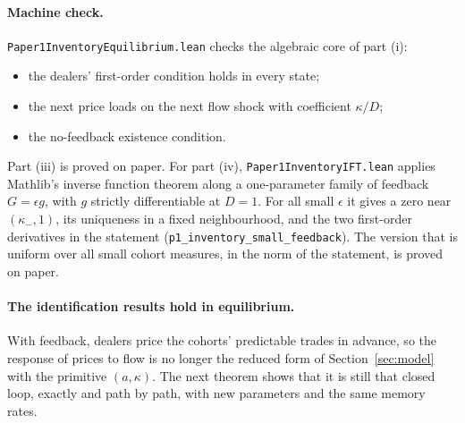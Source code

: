 \documentclass[12pt]{article}
\theoremstyle{definition}
\theoremstyle{remark}
\begin{document}
\paragraph{Machine check.} \nolinkurl{Paper1InventoryEquilibrium.lean} checks the algebraic core of part (i):
\begin{itemize}[itemsep=1pt,topsep=2pt]
\item the dealers' first-order condition holds in every state;
\item the next price loads on the next flow shock with coefficient $\kappa/D$;
\item the no-feedback existence condition.
\end{itemize}
Part (iii) is proved on paper. For part (iv), \nolinkurl{Paper1InventoryIFT.lean} applies Mathlib's inverse function theorem along a one-parameter family of feedback $G=\epsilon g$, with $g$ strictly differentiable at $D=1$. For all small $\epsilon$ it gives a zero near $(\kappa_-,1)$, its uniqueness in a fixed neighbourhood, and the two first-order derivatives in the statement (\nolinkurl{p1_inventory_small_feedback}). The version that is uniform over all small cohort measures, in the norm of the statement, is proved on paper.

\paragraph{The identification results hold in equilibrium.} With feedback, dealers price the cohorts' predictable trades in advance, so the response of prices to flow is no longer the reduced form of Section~\ref{sec:model} with the primitive $(a,\kappa)$. The next theorem shows that it is still that closed loop, exactly and path by path, with new parameters and the same memory rates.
\end{document}
